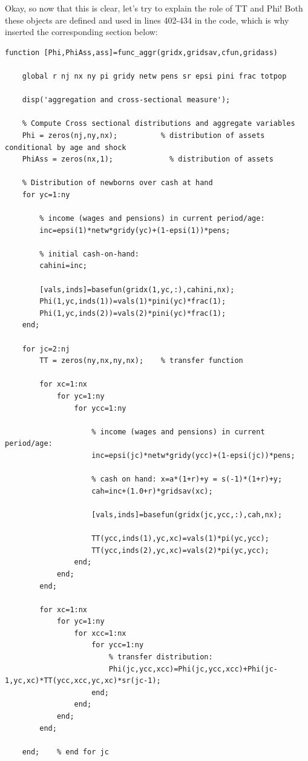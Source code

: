 \documentclass[12pt,a4paper]{article}
\begin{document}
Okay, so now that this is clear, let's try to explain the role of TT and Phi! Both these objects are defined and used in lines 402-434 in the code, which is why  inserted the corresponding section below:

\begin{lstlisting}[frame=single]
    function [Phi,PhiAss,ass]=func_aggr(gridx,gridsav,cfun,gridass)

    global r nj nx ny pi gridy netw pens sr epsi pini frac totpop

    disp('aggregation and cross-sectional measure');

    % Compute Cross sectional distributions and aggregate variables
    Phi = zeros(nj,ny,nx);          % distribution of assets conditional by age and shock
    PhiAss = zeros(nx,1);             % distribution of assets

    % Distribution of newborns over cash at hand
    for yc=1:ny

        % income (wages and pensions) in current period/age:
        inc=epsi(1)*netw*gridy(yc)+(1-epsi(1))*pens;

        % initial cash-on-hand:
        cahini=inc;

        [vals,inds]=basefun(gridx(1,yc,:),cahini,nx);
        Phi(1,yc,inds(1))=vals(1)*pini(yc)*frac(1);
        Phi(1,yc,inds(2))=vals(2)*pini(yc)*frac(1);
    end;

    for jc=2:nj
        TT = zeros(ny,nx,ny,nx);    % transfer function

        for xc=1:nx
            for yc=1:ny
                for ycc=1:ny

                    % income (wages and pensions) in current period/age:
                    inc=epsi(jc)*netw*gridy(ycc)+(1-epsi(jc))*pens;

                    % cash on hand: x=a*(1+r)+y = s(-1)*(1+r)+y;
                    cah=inc+(1.0+r)*gridsav(xc);

                    [vals,inds]=basefun(gridx(jc,ycc,:),cah,nx);

                    TT(ycc,inds(1),yc,xc)=vals(1)*pi(yc,ycc);
                    TT(ycc,inds(2),yc,xc)=vals(2)*pi(yc,ycc);
                end;
            end;
        end;

        for xc=1:nx
            for yc=1:ny
                for xcc=1:nx
                    for ycc=1:ny
                        % transfer distribution:
                        Phi(jc,ycc,xcc)=Phi(jc,ycc,xcc)+Phi(jc-1,yc,xc)*TT(ycc,xcc,yc,xc)*sr(jc-1);
                    end;
                end;
            end;
        end;

    end;    % end for jc


\end{lstlisting}
\end{document}
